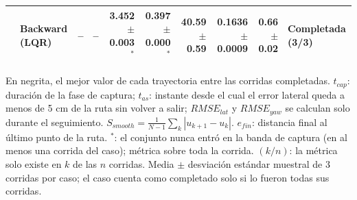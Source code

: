 \begin{table}[htbp]
\begin{tabular}{llrrrrrrrl}
 & Backward (LQR) & -- & -- & \textbf{3.452} $\pm$ 0.003$^{*}$ & 0.397 $\pm$ 0.000$^{*}$ & 40.59 $\pm$ 0.59 & 0.1636 $\pm$ 0.0009 & \textbf{0.66} $\pm$ 0.02 & Completada (3/3) \\
\bottomrule
\end{tabular}
\par\smallskip\footnotesize En negrita, el mejor valor de cada trayectoria entre las corridas completadas. $t_{cap}$: duración de la fase de captura; $t_{as}$: instante desde el cual el error lateral queda a menos de 5 cm de la ruta sin volver a salir; $RMSE_{lat}$ y $RMSE_{yaw}$ se calculan solo durante el seguimiento. $S_{smooth} = \frac{1}{N-1}\sum_k |u_{k+1}-u_k|$. $e_{fin}$: distancia final al último punto de la ruta. $^{*}$: el conjunto nunca entró en la banda de captura (en al menos una corrida del caso); métrica sobre toda la corrida. $(k/n)$: la métrica solo existe en $k$ de las $n$ corridas. Media $\pm$ desviación estándar muestral de 3 corridas por caso; el caso cuenta como completado solo si lo fueron todas sus corridas.
\end{table}
